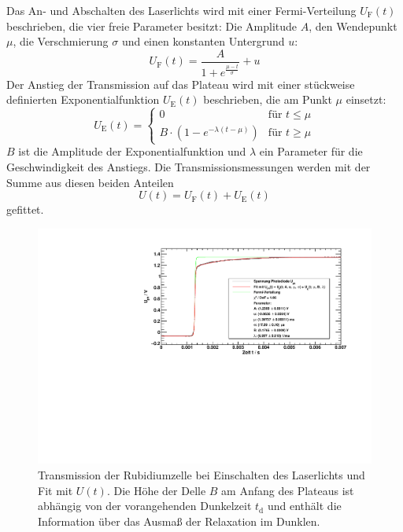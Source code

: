 Das An- und Abschalten des Laserlichts wird mit einer Fermi-Verteilung $U_{\text{F}}(t)$ beschrieben,
die vier freie Parameter besitzt:
Die Amplitude $A$, den Wendepunkt $\mu$, die Verschmierung $\sigma$ und einen konstanten Untergrund $u$:
\begin{equation}
  U_{\text{F}}(t)=\frac{A}{1+e^{\frac{\mu - t}{\sigma}}} + u
\end{equation}
Der Anstieg der Transmission auf das Plateau wird mit einer
stückweise definierten Exponentialfunktion $U_{\text{E}}(t)$
beschrieben, die am Punkt $\mu$ einsetzt:
\begin{equation}
  U_{\text{E}}(t)=
  \begin{cases}
  0	& \text{für } t \leq \mu \\
  B \cdot \left( 1-e^{-\lambda(t-\mu)} \right)  & \text{für } t \geq \mu
  \end{cases}
\end{equation}
$B$ ist die Amplitude der Exponentialfunktion und $\lambda$ ein Parameter für die Geschwindigkeit des Anstiegs.
Die Transmissionsmessungen werden mit der Summe aus diesen beiden Anteilen
\begin{equation}
\label{eq:fra:fitfunct}
   U(t)= U_{\text{F}}(t)+ U_{\text{E}}(t)
\end{equation}
gefittet.


\begin{figure}[H]
\begin{center}
  \includegraphics[width=\textwidth]{../img/part6/05.pdf}
  \caption{Transmission der Rubidiumzelle bei Einschalten des Laserlichts und Fit mit $U(t)$.
  Die Höhe der Delle $B$ am Anfang des Plateaus ist abhängig von der vorangehenden Dunkelzeit $t_\text{d}$
  und enthält die Information über das Ausmaß der Relaxation im Dunklen.}
  \label{img:fra:exampletrans}
\end{center}
\end{figure}

